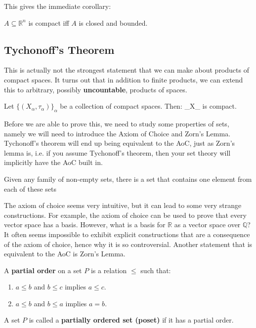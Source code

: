 	This gives the immediate corollary:
	
	\begin{corollary}
		$A\subseteq\mathbb R^n$ is compact iff $A$ is closed and bounded.
	\end{corollary}
	
	\subsection{Tychonoff's Theorem}
	
	This is actually not the strongest statement that we can make about products of compact spaces. It turns out that in 
	addition to finite products, we can extend this to arbitrary, possibly \textbf{uncountable}, products of spaces.
	
	\begin{theorem}[Tychonoff]
		Let $\{(X_\alpha, \tau_\alpha)\}_\alpha$ be a collection of compact spaces. Then:
		\eq
			\prod_\alpha X_\alpha
		\qe
		is compact.
	\end{theorem}
	
	Before we are able to prove this, we need to study some properties of sets, namely we will need to introduce the 
	Axiom of Choice and Zorn's Lemma. Tychonoff's theorem will end up being equivalent to the AoC, just as Zorn's 
	lemma is, i.e. if you assume Tychonoff's theorem, then your set theory will implicitly have the AoC built in. 
	
	\begin{definition}
		Given any family of non-empty sets, there is a set that contains one element from each of these sets
	\end{definition}
	
	The axiom of choice seems very intuitive, but it can lead to some very strange constructions. For example, the axiom 
	of choice can be used to prove that every vector space has a basis. However, what is a basis for $\mathbb R$ as a 
	vector space over $\mathbb Q$? It often seems impossible to exhibit explicit constructions that are a consequence 
	of the axiom of choice, hence why it is so controversial. Another statement that is equivalent to the AoC is 
	Zorn's Lemma.
	
	\begin{definition}
		A \textbf{partial order} on a set $P$ is a relation $\leq$ such that:
		\begin{enumerate}
			\item $a\leq b$ and $b\leq c$ implies $a\leq c$.
			\item $a\leq b$ and $b\leq a$ implies $a = b$.
		\end{enumerate}
		A set $P$ is called a \textbf{partially ordered set (poset)} if it has a partial order.
	\end{definition}
	
